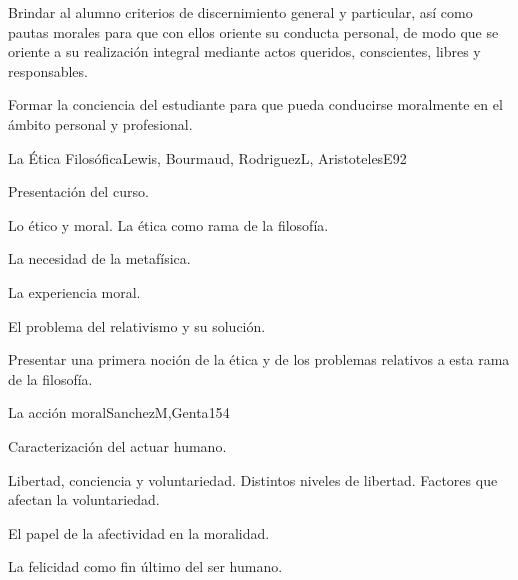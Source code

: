 \begin{syllabus}


\begin{justification}
Brindar al alumno criterios de discernimiento general y particular, así como pautas morales para que con ellos oriente su conducta personal, de modo que se oriente a su realización integral mediante actos queridos, conscientes, libres y responsables. 
\end{justification}

\begin{goals}
\item Formar la conciencia del estudiante para que pueda conducirse moralmente en el ámbito personal y profesional.
\end{goals}

\begin{outcomes}
\end{outcomes}

\begin{unit}{La Ética Filosófica}{Lewis, Bourmaud, RodriguezL, AristotelesE}{9}{2}
\begin{topics}
	\item	Presentación del curso. 
	\item	Lo ético y moral. La ética como rama de la filosofía.
	\item	La necesidad de la metafísica.
	\item	La experiencia moral.
	\item	El problema del relativismo y su solución.
	
\end{topics}
\begin{learningoutcomes}
	\item Presentar una primera noción de la ética y de los problemas relativos a esta rama de la filosofía.
\end{learningoutcomes}
\end{unit}

\begin{unit}{La acción moral}{SanchezM,Genta}{15}{4}
\begin{topics}
	\item	Caracterización del actuar humano. 
	\item	Libertad, conciencia y voluntariedad. Distintos niveles de libertad. Factores que afectan la voluntariedad.
	\item	El papel de la afectividad en la moralidad.
	\item	La felicidad como fin último del ser humano.


\end{topics}
\end{unit}
\end{syllabus}
